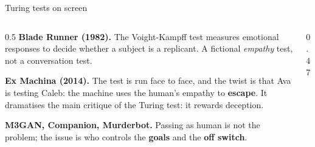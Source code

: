 \begin{frame}{Turing tests on screen}
\begin{columns}[T]
\begin{column}{0.5\textwidth}
\small
\textbf{Blade Runner (1982).} The Voight-Kampff test measures emotional responses to decide whether a subject is a replicant. A fictional \emph{empathy} test, not a conversation test.

\textbf{Ex Machina (2014).} The test is run face to face, and the twist is that Ava is testing Caleb: the machine uses the human's empathy to \textbf{escape}. It dramatises the main critique of the Turing test: it rewards deception.

\textbf{M3GAN, Companion, Murderbot.} Passing as human is not the problem; the issue is who controls the \textbf{goals} and the \textbf{off switch}.
\end{column}
\begin{column}{0.47\textwidth}
\end{column}
\end{columns}
\end{frame}

